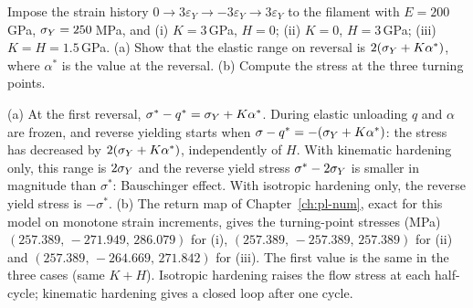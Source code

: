 \label{exo:pl-cyclic}
%
Impose the strain history $0\to3\varepsilon_Y\to-3\varepsilon_Y\to3\varepsilon_Y$
to the filament with $E=200$\,GPa, $\sigma_{Y}=250$\,MPa, and (i) $K=3$\,GPa, $H=0$;
(ii) $K=0$, $H=3$\,GPa; (iii) $K=H=1.5$\,GPa. (a) Show that the elastic range on
reversal is $2(\sigma_{Y}+K\alpha^*)$, where $\alpha^*$ is the value at the reversal.
(b) Compute the stress at the three turning points.
\begin{solution}
(a) At the first reversal, $\sigma^*-q^*=\sigma_{Y}+K\alpha^*$. During elastic
unloading $q$ and $\alpha$ are frozen, and reverse yielding starts when
$\sigma-q^*=-(\sigma_{Y}+K\alpha^*)$: the stress has decreased by $2(\sigma_{Y}+K\alpha^*)$,
independently of $H$. With kinematic hardening only, this range is $2\sigma_{Y}$ and
the reverse yield stress $\sigma^*-2\sigma_{Y}$ is smaller in magnitude than
$\sigma^*$: Bauschinger effect. With isotropic hardening only, the reverse
yield stress is $-\sigma^*$.
(b) The return map of Chapter~\ref{ch:pl-num}, exact for this model on
monotone strain increments, gives the turning-point stresses (MPa)
$(257.389,\,-271.949,\,286.079)$ for (i), $(257.389,\,-257.389,\,257.389)$ for
(ii) and $(257.389,\,-264.669,\,271.842)$ for (iii). The first value is the same
in the three cases (same $K+H$). Isotropic hardening raises the flow stress at
each half-cycle; kinematic hardening gives a closed loop after one cycle.

\end{solution}

